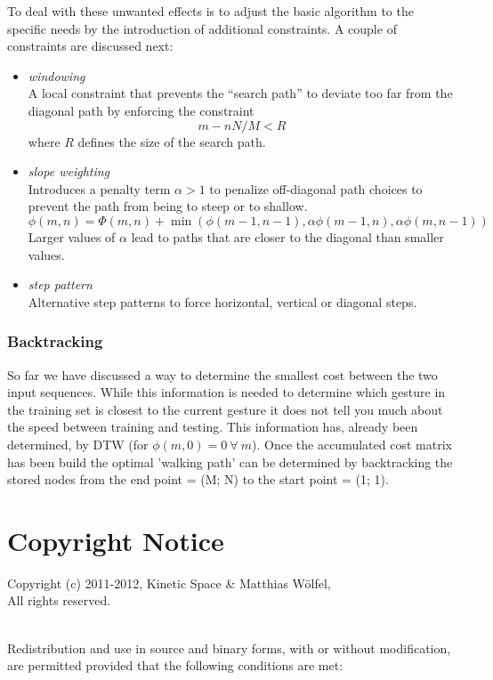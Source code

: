 \documentclass[titlepage,12pt,a4paper]{article}
\begin{document}
To deal with these unwanted effects is to adjust the basic algorithm to the specific needs by the introduction of additional constraints. A couple of constraints are discussed next:
\begin{itemize}
	\item \emph{windowing}\\ A local constraint that prevents the “search path” to deviate too far from the diagonal path by enforcing the constraint \[m-nN/M<R\] where $R$ defines the size of the search path. 
	\item \emph{slope weighting}\\ Introduces a penalty term $\alpha>1$ to penalize off-diagonal path choices to prevent the path from being to steep or to shallow.
\[
	\phi(m,n) = \Phi(m,n) + \min{(\phi(m-1,n-1),\alpha\phi(m-1,n),\alpha\phi(m,n-1))}
\]
Larger values of $\alpha$ lead to paths that are closer to the diagonal than smaller values.
	\item \emph{step pattern}\\ Alternative step patterns to force horizontal, vertical or diagonal steps.
\end{itemize}

\subsubsection{Backtracking}
\label{sec:backtracking}
So far we have discussed a way to determine the smallest cost between the two input sequences. While this information is needed to determine which gesture in the training set is closest to the current gesture it does not tell you much about the speed between training and testing. This information has, already been determined, by DTW (for $\phi(m,0) = 0~\forall~m$). Once the accumulated cost matrix has been build the optimal 'walking path' can be determined by backtracking the stored nodes from the end point = (M; N) to the start point = (1; 1).

\newpage

\section{Copyright Notice}
Copyright (c) 2011-2012, Kinetic Space \& Matthias W\"olfel, \\
All rights reserved.

~\\

Redistribution and use in source and binary forms, with or without 
modification, are permitted provided that the following conditions are met:
\end{document}
